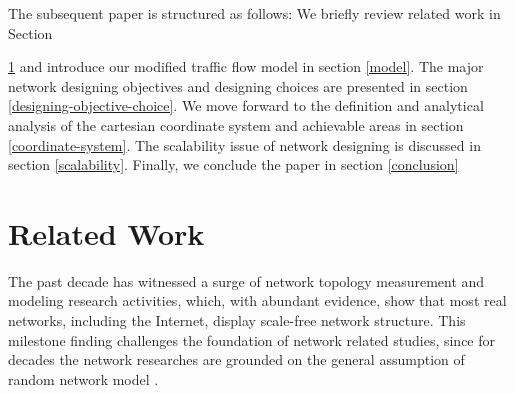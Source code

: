 \documentclass[journal]{IEEEtran}
\begin{document}
The subsequent paper is structured as follows: We briefly review
related work in Section {\ref{related-work} and introduce our
modified traffic flow model in section \ref{model}. The major
network designing objectives and designing choices are presented in
section \ref{designing-objective-choice}. We move forward to the
definition and analytical analysis of the cartesian coordinate
system and achievable areas in section \ref{coordinate-system}. The
scalability issue of network designing is discussed in section
\ref{scalability}. Finally, we conclude the paper in section
\ref{conclusion}


\section{Related Work}\label{related-work}
The past decade has witnessed a surge of network topology
measurement and modeling research activities\cite{powerlaw1999,BA,
clustering, assortative-mixing, ark, DIMES,
rocketfuel,chinese-internet, internet-evolution}, which, with
abundant evidence, show that most real networks, including the
Internet, display scale-free network structure. This milestone
finding challenges the foundation of network related studies, since
for decades the network researches are grounded on the general
assumption of random network model \cite{erdos59}.

}
\end{document}
